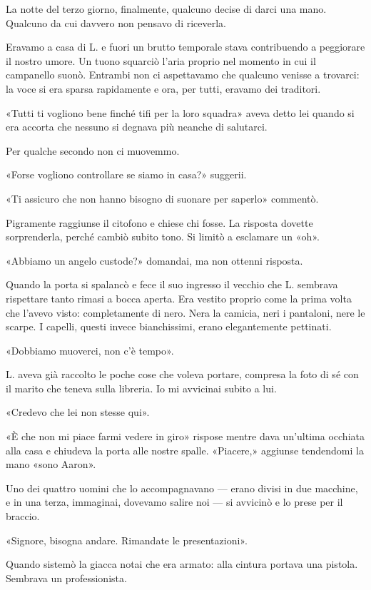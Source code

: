 \documentclass[a4paper,12pt]{book}
\begin{document}
La notte del terzo giorno, finalmente, qualcuno decise di darci una mano.
Qualcuno da cui davvero non pensavo di riceverla.

Eravamo a casa di L. e fuori un brutto temporale stava contribuendo a peggiorare
il nostro umore. Un tuono squarciò l'aria proprio nel momento in cui il
campanello suonò. Entrambi non ci aspettavamo che qualcuno venisse a trovarci:
la voce si era sparsa rapidamente e ora, per tutti, eravamo dei traditori.

«Tutti ti vogliono bene finché tifi per la loro squadra» aveva detto lei quando
si era accorta che nessuno si degnava più neanche di salutarci.

Per qualche secondo non ci muovemmo.

«Forse vogliono controllare se siamo in casa?» suggerii.

«Ti assicuro che non hanno bisogno di suonare per saperlo» commentò.

Pigramente raggiunse il citofono e chiese chi fosse. La risposta dovette
sorprenderla, perché cambiò subito tono. Si limitò a esclamare un «oh».

«Abbiamo un angelo custode?» domandai, ma non ottenni risposta.

Quando la porta si spalancò e fece il suo ingresso il vecchio che L. sembrava
rispettare tanto rimasi a bocca aperta. Era vestito proprio come la prima volta
che l'avevo visto: completamente di nero. Nera la camicia, neri i pantaloni,
nere le scarpe. I capelli, questi invece bianchissimi, erano elegantemente
pettinati.

«Dobbiamo muoverci, non c'è tempo».

L. aveva già raccolto le poche cose che voleva portare, compresa la foto di sé
con il marito che teneva sulla libreria. Io mi avvicinai subito a lui.

«Credevo che lei non stesse qui».

«È che non mi piace farmi vedere in giro» rispose mentre dava un'ultima occhiata
alla casa e chiudeva la porta alle nostre spalle. «Piacere,» aggiunse tendendomi
la mano «sono Aaron».

Uno dei quattro uomini che lo accompagnavano --- erano divisi in due macchine,
e in una terza, immaginai, dovevamo salire noi --- si avvicinò e lo prese per
il braccio.

«Signore, bisogna andare. Rimandate le presentazioni».

Quando sistemò la giacca notai che era armato: alla cintura portava una pistola.
Sembrava un professionista.
\end{document}
